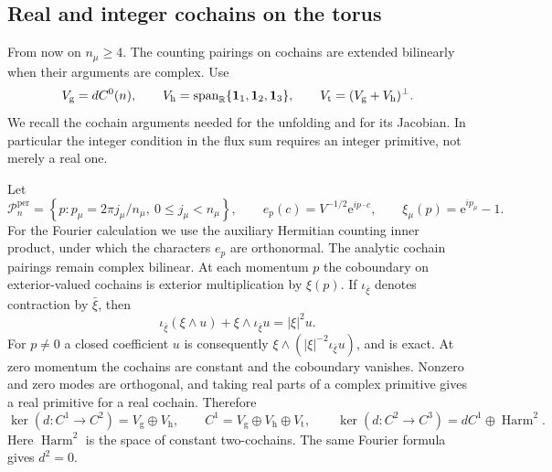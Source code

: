 \subsection{Real and integer cochains on the torus}
\label{subsec:external-cochains}

From now on $n_\mu\ge4$. The counting pairings on cochains
are extended bilinearly when their arguments are complex.
Use
\[
 V_{\mathrm g}=dC^0(n),\qquad
 V_{\mathrm h}=\operatorname{span}_{\mathbb R}\{\mathbf1_1,\mathbf1_2,\mathbf1_3\},
 \qquad
 V_{\mathrm t}=(V_{\mathrm g}+V_{\mathrm h})^\perp.
\]
We recall the cochain arguments needed for the unfolding and
for its Jacobian. In particular the integer condition in the
flux sum requires an integer primitive, not merely a real one.

Let
\[
 \mathcal P_n^{\mathrm{per}}=
   \left\{p:p_\mu=2\pi j_\mu/n_\mu,\ 0\le j_\mu<n_\mu\right\},
 \qquad e_p(c)=V^{-1/2}\mathrm e^{ip\cdot c},\qquad
 \xi_\mu(p)=\mathrm e^{ip_\mu}-1.
\]
For the Fourier calculation we use the auxiliary Hermitian counting
inner product, under which the characters $e_p$ are orthonormal.
The analytic cochain pairings remain complex bilinear. At each momentum $p$ the
coboundary on exterior-valued cochains is exterior multiplication
by $\xi(p)$. If $\iota_{\bar\xi}$ denotes contraction by $\bar\xi$,
then
\[
 \iota_{\bar\xi}(\xi\wedge u)+
                  \xi\wedge\iota_{\bar\xi}u=|\xi|^2u.
\]
For $p\ne0$ a closed coefficient $u$ is consequently
$\xi\wedge(|\xi|^{-2}\iota_{\bar\xi}u)$, and is exact.
At zero momentum the cochains are constant and the
coboundary vanishes. Nonzero and zero modes are orthogonal,
and taking real parts of a complex primitive gives a real
primitive for a real cochain. Therefore
\begin{equation}\label{eq:external-Hodge}
 \ker(d:C^1\to C^2)=V_{\mathrm g}\oplus V_{\mathrm h},
 \qquad C^1=V_{\mathrm g}\oplus V_{\mathrm h}\oplus V_{\mathrm t},
 \qquad
 \ker(d:C^2\to C^3)=dC^1\oplus\operatorname{Harm}^2.
\end{equation}
Here $\operatorname{Harm}^2$ is the space of constant two-cochains.
The same Fourier formula gives $d^2=0$.

